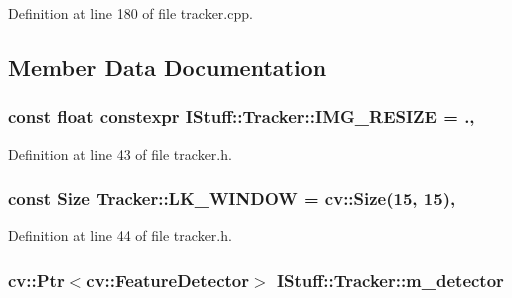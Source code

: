 Definition at line 180 of file tracker.\-cpp.



\subsection{Member Data Documentation}
\hypertarget{class_i_stuff_1_1_tracker_af0b19050495dbda2d14bdba30fd4eb9a}{
\subsubsection[{I\-M\-G\-\_\-\-R\-E\-S\-I\-Z\-E}]{\setlength{\rightskip}{0pt plus 5cm}const float constexpr I\-Stuff\-::\-Tracker\-::\-I\-M\-G\-\_\-\-R\-E\-S\-I\-Z\-E = .\hspace{0.3cm}{\ttfamily [static]}, {\ttfamily [private]}}}\label{class_i_stuff_1_1_tracker_af0b19050495dbda2d14bdba30fd4eb9a}


Definition at line 43 of file tracker.\-h.

\hypertarget{class_i_stuff_1_1_tracker_af8521ba1a18dab69b2ff367799fc2101}{
\subsubsection[{L\-K\-\_\-\-W\-I\-N\-D\-O\-W}]{\setlength{\rightskip}{0pt plus 5cm}const Size Tracker\-::\-L\-K\-\_\-\-W\-I\-N\-D\-O\-W = cv\-::\-Size(15, 15)\hspace{0.3cm}{\ttfamily [static]}, {\ttfamily [private]}}}\label{class_i_stuff_1_1_tracker_af8521ba1a18dab69b2ff367799fc2101}


Definition at line 44 of file tracker.\-h.

\hypertarget{class_i_stuff_1_1_tracker_a7efbebcf19f9308ae8b74232d809e47a}{
\subsubsection[{m\-\_\-detector}]{\setlength{\rightskip}{0pt plus 5cm}cv\-::\-Ptr$<$cv\-::\-Feature\-Detector$>$ I\-Stuff\-::\-Tracker\-::m\-\_\-detector\hspace{0.3cm}{\ttfamily [private]}}}\label{class_i_stuff_1_1_tracker_a7efbebcf19f9308ae8b74232d809e47a}


